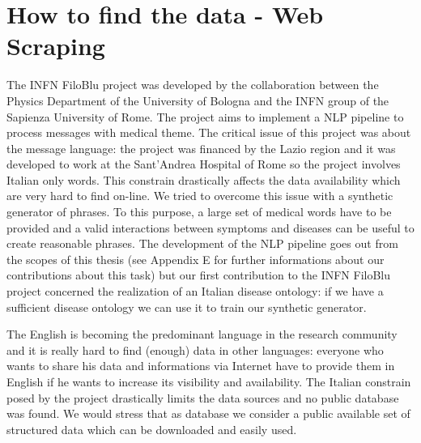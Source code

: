 \documentclass{standalone}
\begin{document}
\section[Web Scraping]{How to find the data - Web Scraping}\label{chimera:web_scraping}

The INFN FiloBlu project was developed by the collaboration between the Physics Department of the University of Bologna and the INFN group of the Sapienza University of Rome.
The project aims to implement a NLP pipeline to process messages with medical theme.
The critical issue of this project was about the message language: the project was financed by the Lazio region and it was developed to work at the Sant'Andrea Hospital of Rome so the project involves Italian only words.
This constrain drastically affects the data availability which are very hard to find on-line.
We tried to overcome this issue with a synthetic generator of phrases.
To this purpose, a large set of medical words have to be provided and a valid interactions between symptoms and diseases can be useful to create reasonable phrases.
The development of the NLP pipeline goes out from the scopes of this thesis (see Appendix E for further informations about our contributions about this task) but our first contribution to the INFN FiloBlu project concerned the realization of an Italian disease ontology: if we have a sufficient disease ontology we can use it to train our synthetic generator.

The English is becoming the predominant language in the research community and it is really hard to find (enough) data in other languages: everyone who wants to share his data and informations via Internet have to provide them in English if he wants to increase its visibility and availability.
The Italian constrain posed by the project drastically limits the data sources and no public database was found.
We would stress that as database we consider a public available set of structured data which can be downloaded and easily used.
\end{document}
